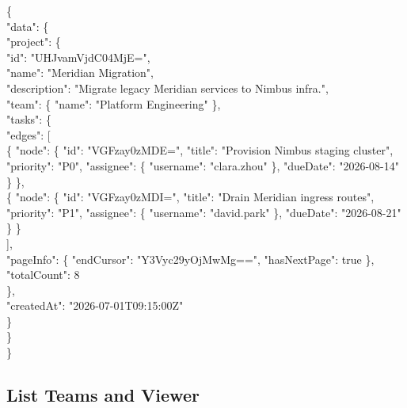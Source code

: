 \vspace{4pt}

\begin{responsebox}[title=Response]
\{\\
\quad "data": \{\\
\qquad "project": \{\\
\qquad\quad "id": "UHJvamVjdC04MjE=",\\
\qquad\quad "name": "Meridian Migration",\\
\qquad\quad "description": "Migrate legacy Meridian services to Nimbus infra.",\\
\qquad\quad "team": \{ "name": "Platform Engineering" \},\\
\qquad\quad "tasks": \{\\
\qquad\qquad "edges": [\\
\qquad\qquad\quad \{ "node": \{ "id": "VGFzay0zMDE=", "title": "Provision Nimbus staging cluster", "priority": "P0", "assignee": \{ "username": "clara.zhou" \}, "dueDate": "2026-08-14" \} \},\\
\qquad\qquad\quad \{ "node": \{ "id": "VGFzay0zMDI=", "title": "Drain Meridian ingress routes", "priority": "P1", "assignee": \{ "username": "david.park" \}, "dueDate": "2026-08-21" \} \}\\
\qquad\qquad ],\\
\qquad\qquad "pageInfo": \{ "endCursor": "Y3Vyc29yOjMwMg==", "hasNextPage": true \},\\
\qquad\qquad "totalCount": 8\\
\qquad\quad \},\\
\qquad\quad "createdAt": "2026-07-01T09:15:00Z"\\
\qquad \}\\
\quad \}\\
\}
\end{responsebox}

\subsection*{List Teams and Viewer}

\vspace{2pt}

